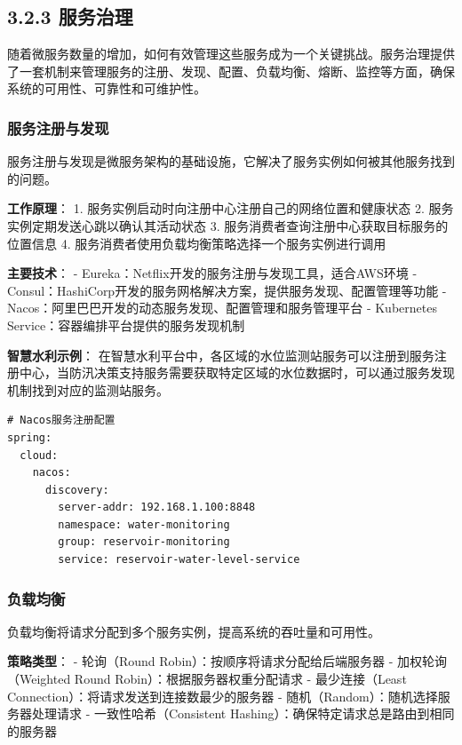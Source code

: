 \subsection{3.2.3 服务治理}\label{ux670dux52a1ux6cbbux7406}

随着微服务数量的增加，如何有效管理这些服务成为一个关键挑战。服务治理提供了一套机制来管理服务的注册、发现、配置、负载均衡、熔断、监控等方面，确保系统的可用性、可靠性和可维护性。

\subsubsection{服务注册与发现}\label{ux670dux52a1ux6ce8ux518cux4e0eux53d1ux73b0}

服务注册与发现是微服务架构的基础设施，它解决了服务实例如何被其他服务找到的问题。

\textbf{工作原理}： 1.
服务实例启动时向注册中心注册自己的网络位置和健康状态 2.
服务实例定期发送心跳以确认其活动状态 3.
服务消费者查询注册中心获取目标服务的位置信息 4.
服务消费者使用负载均衡策略选择一个服务实例进行调用

\textbf{主要技术}： -
Eureka：Netflix开发的服务注册与发现工具，适合AWS环境 -
Consul：HashiCorp开发的服务网格解决方案，提供服务发现、配置管理等功能 -
Nacos：阿里巴巴开发的动态服务发现、配置管理和服务管理平台 - Kubernetes
Service：容器编排平台提供的服务发现机制

\textbf{智慧水利示例}：
在智慧水利平台中，各区域的水位监测站服务可以注册到服务注册中心，当防汛决策支持服务需要获取特定区域的水位数据时，可以通过服务发现机制找到对应的监测站服务。

\begin{lstlisting}
# Nacos服务注册配置
spring:
  cloud:
    nacos:
      discovery:
        server-addr: 192.168.1.100:8848
        namespace: water-monitoring
        group: reservoir-monitoring
        service: reservoir-water-level-service
\end{lstlisting}

\subsubsection{负载均衡}\label{ux8d1fux8f7dux5747ux8861}

负载均衡将请求分配到多个服务实例，提高系统的吞吐量和可用性。

\textbf{策略类型}： - 轮询（Round Robin）：按顺序将请求分配给后端服务器
- 加权轮询（Weighted Round Robin）：根据服务器权重分配请求 -
最少连接（Least Connection）：将请求发送到连接数最少的服务器 -
随机（Random）：随机选择服务器处理请求 - 一致性哈希（Consistent
Hashing）：确保特定请求总是路由到相同的服务器

